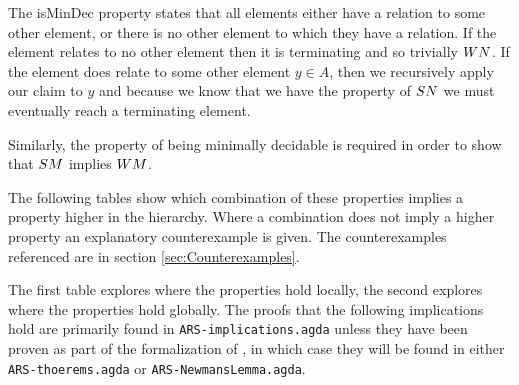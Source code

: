 The isMinDec property states that all elements either have a relation to some other element, or 
there is no other element to which they have a relation. If the element relates to no other element then it is terminating 
and so trivially $\WN$. If the element does relate to some other element $y \in A$, then we recursively apply our claim to 
$y$ and because we know that we have the property of $\SN$ we must eventually reach a terminating element. 

Similarly, the property of being minimally decidable is required in order to show that $\SM$ implies $\WM$.

The following tables show which combination of these properties implies a property higher in the hierarchy. Where a combination 
does not imply a higher property an explanatory counterexample is given. The counterexamples referenced are in section \ref{sec:Counterexamples}.

The first table explores where the properties hold locally, the second explores where the properties hold globally. The proofs that the 
following implications hold are primarily found in \texttt{ARS-implications.agda} unless they have been proven as part of the formalization 
of \terese, in which case they will be found in either \texttt{ARS-thoerems.agda} or \texttt{ARS-NewmansLemma.agda}.


